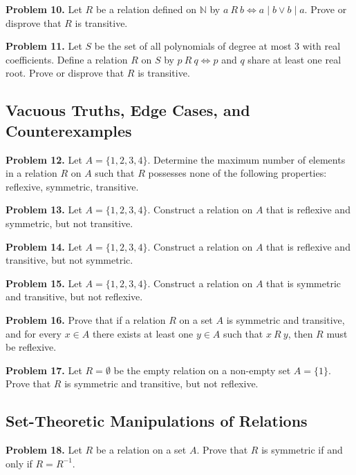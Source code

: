 \documentclass[11pt, a4paper]{article}
\theoremstyle{definition}
\theoremstyle{remark}
\newcommand{\N}{\mathbb{N}}
\begin{document}
\vspace{0.5em}
\noindent
\textbf{Problem 10.} Let $R$ be a relation defined on $\N$ by $a \ R \ b \iff a \mid b \lor b \mid a$. Prove or disprove that $R$ is transitive.

\vspace{0.5em}
\noindent
\textbf{Problem 11.} Let $S$ be the set of all polynomials of degree at most 3 with real coefficients. Define a relation $R$ on $S$ by $p \ R \ q \iff p$ and $q$ share at least one real root. Prove or disprove that $R$ is transitive.

\subsection{Vacuous Truths, Edge Cases, and Counterexamples}
\textbf{Problem 12.} Let $A = \{1, 2, 3, 4\}$. Determine the maximum number of elements in a relation $R$ on $A$ such that $R$ possesses none of the following properties: reflexive, symmetric, transitive.

\vspace{0.5em}
\noindent
\textbf{Problem 13.} Let $A = \{1, 2, 3, 4\}$. Construct a relation on $A$ that is reflexive and symmetric, but not transitive.

\vspace{0.5em}
\noindent
\textbf{Problem 14.} Let $A = \{1, 2, 3, 4\}$. Construct a relation on $A$ that is reflexive and transitive, but not symmetric.

\vspace{0.5em}
\noindent
\textbf{Problem 15.} Let $A = \{1, 2, 3, 4\}$. Construct a relation on $A$ that is symmetric and transitive, but not reflexive.

\vspace{0.5em}
\noindent
\textbf{Problem 16.} Prove that if a relation $R$ on a set $A$ is symmetric and transitive, and for every $x \in A$ there exists at least one $y \in A$ such that $x \ R \ y$, then $R$ must be reflexive.

\vspace{0.5em}
\noindent
\textbf{Problem 17.} Let $R = \emptyset$ be the empty relation on a non-empty set $A = \{1\}$. Prove that $R$ is symmetric and transitive, but not reflexive.

\subsection{Set-Theoretic Manipulations of Relations}
\textbf{Problem 18.} Let $R$ be a relation on a set $A$. Prove that $R$ is symmetric if and only if $R = R^{-1}$.
\end{document}
